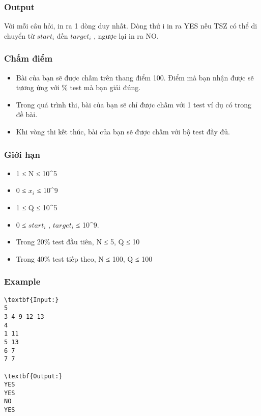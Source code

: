 \subsubsection{Output}

Với mỗi câu hỏi, in ra 1 dòng duy nhất. Dòng thứ i in ra YES nếu TSZ có thể di chuyển từ $start_{i}$ đến $target_{i}$ , ngược lại in ra NO.

\subsubsection{Chấm điểm}
\begin{itemize}
	\item Bài của bạn sẽ được chấm trên thang điểm 100. Điểm mà bạn nhận được sẽ tương ứng với \% test mà bạn giải đúng.
	\item Trong quá trình thi, bài của bạn sẽ chỉ được chấm với 1 test ví dụ có trong đề bài.
	\item Khi vòng thi kết thúc, bài của bạn sẽ được chấm với bộ test đầy đủ.
\end{itemize}

\subsubsection{Giới hạn}
\begin{itemize}
	\item 1 ≤ N ≤ 10^5
	\item 0 ≤ $x_{i}$ ≤ 10^9
	\item 1 ≤ Q ≤ 10^5
	\item 0 ≤ $start_{i}$ , $target_{i}$ ≤ 10^9.
	\item Trong 20\% test đầu tiên, N ≤ 5, Q ≤ 10
	\item Trong 40\% test tiếp theo, N ≤ 100, Q ≤ 100
\end{itemize}

\subsubsection{Example}
\begin{verbatim}
\textbf{Input:}
5
3 4 9 12 13
4
1 11
5 13
6 7
7 7

\textbf{Output:}
YES
YES
NO
YES
\end{verbatim}
